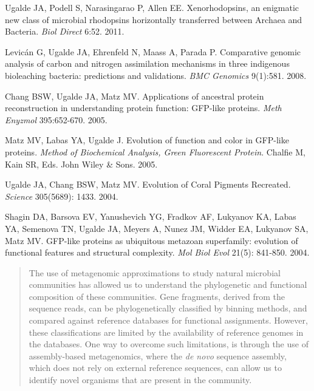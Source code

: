 \begin{frontmatter}
\begin{vitapage}
\begin{publications}
  \item Ugalde JA, Podell S, Narasingarao P, Allen EE. Xenorhodopsins, an enigmatic new class of microbial rhodopsins horizontally transferred between Archaea and Bacteria. \emph{Biol Direct} 6:52. 2011.
  
  \item Levic\'{a}n G, Ugalde JA, Ehrenfeld N, Maass A, Parada P. Comparative genomic analysis of carbon and nitrogen assimilation mechanisms in three indigenous bioleaching bacteria: predictions and validations. \emph{BMC Genomics} 9(1):581. 2008.
  
  \item Chang BSW, Ugalde JA, Matz MV. Applications of ancestral protein reconstruction in understanding protein function: GFP-like proteins. \emph{Meth Enyzmol} 395:652-670. 2005.
  
  \item Matz MV, Labas YA, Ugalde J. Evolution of function and color in GFP-like proteins. \emph{Method of Biochemical Analysis, Green Fluorescent Protein}. Chalfie M, Kain SR, Eds. John Wiley \& Sons. 2005.
  
  \item Ugalde JA, Chang BSW, Matz MV. Evolution of Coral Pigments Recreated. \emph{Science} 305(5689): 1433. 2004.
  
  \item Shagin DA, Barsova EV, Yanushevich YG, Fradkov AF, Lukyanov KA, Labas YA, Semenova TN, Ugalde JA, Meyers A, Nunez JM, Widder EA, Lukyanov SA, Matz MV. GFP-like proteins as ubiquitous metazoan superfamily: evolution of functional features and structural complexity. \emph{Mol Biol Evol} 21(5): 841-850. 2004.
  
\end{publications}
\end{vitapage}


%
%
\begin{abstract}

The use of metagenomic approximations to study natural microbial communities has allowed us to understand the phylogenetic and functional composition of these communities. Gene fragments, derived from the sequence reads, can be phylogenetically classified by binning methods, and compared against reference databases for functional assignments. However, these classifications are limited by the availability of reference genomes in the databases. One way to overcome such limitations, is through the use of assembly-based metagenomics, where the \textit{de novo} sequence assembly, which does not rely on external reference sequences, can allow us to identify novel organisms that are present in the community. 


\end{abstract}
\end{frontmatter}
